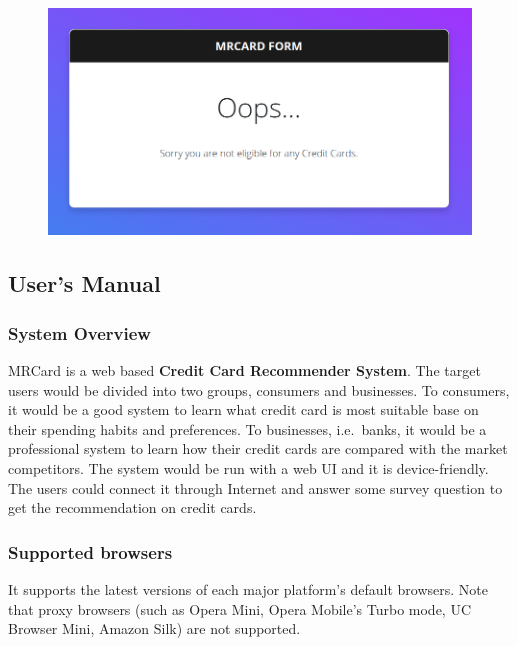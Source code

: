 		\begin{figure}[H]
			\centering
			\includegraphics[width=\linewidth]{img/scenario3_no_recommendation.png}
		\end{figure}

\subsection{User's Manual} %
\label{sub:appendix_b}

	\subsubsection{System Overview}
	MRCard is a web based \textbf{Credit Card Recommender System}. The target users would be divided into two groups, consumers and businesses. To consumers, it would be a good system to learn what credit card is most suitable base on their spending habits and preferences. To businesses, i.e.\ banks, it would be a professional system to learn how their credit cards are compared with the market competitors. The system would be run with a web UI and it is device-friendly. The users could connect it through Internet and answer some survey question to get the recommendation on credit cards.

	\subsubsection{Supported browsers}

		It supports the latest versions of each major platform’s default browsers. Note that proxy browsers (such as Opera Mini, Opera Mobile’s Turbo mode, UC Browser Mini, Amazon Silk) are not supported.

